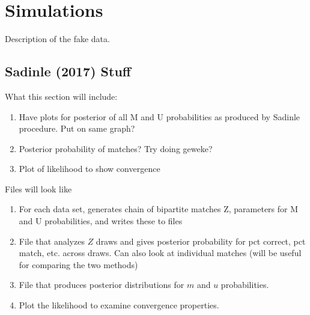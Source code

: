 \documentclass[11pt,reqno]{amsart}
\begin{document}
\section{Simulations}
Description of the fake data.  
\subsection{Sadinle (2017) Stuff}
What this section will include:
\begin{enumerate}
\item Have plots for posterior of all M and U probabilities as produced by Sadinle procedure.  Put on same graph? 
\item Posterior probability of matches? Try doing geweke? 
\item Plot of likelihood to show convergence
\end{enumerate}

Files will look like 
\begin{enumerate}
\item For each data set, generates chain of bipartite matches Z, parameters for M and U probabilities, and writes these to files
\item File that analyzes $Z$ draws and gives posterior probability for pct correct, pct match, etc. across draws.  Can also look at individual matches (will be useful for comparing the two methods)
\item File that produces posterior distributions for $m$ and $u$ probabilities. 
\item Plot the likelihood to examine convergence properties.  
\end{enumerate}
\end{document}
